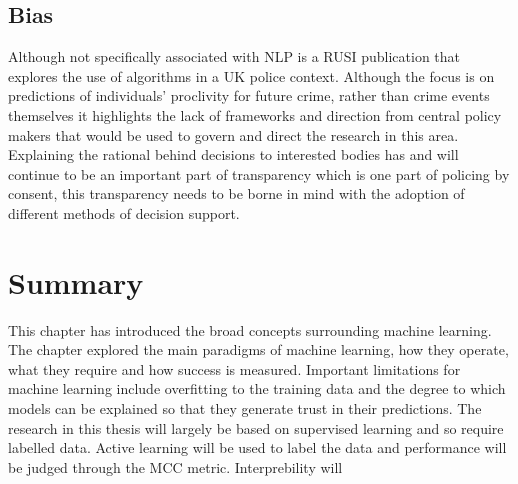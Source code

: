 \subsection{Bias}
Although not specifically associated with NLP  \textcite{babuta2018machine} is a RUSI publication that explores the use of algorithms in a UK police context. Although the focus is on predictions of individuals' proclivity for future crime, rather than crime events themselves it highlights the lack of frameworks and direction from central policy makers that would be used to govern and direct the research in this area. Explaining the rational behind decisions to interested bodies has and will continue to be an important part of transparency which is one part of policing by consent, this transparency needs to be borne in mind with the adoption of different methods of decision support. 

\section{Summary}

This chapter has introduced the broad concepts surrounding machine learning. The chapter explored the main paradigms of machine learning, how they operate, what they require and how success is measured. Important limitations for machine learning include overfitting to the training data  and the degree to which models can be explained so that they generate trust in their predictions. The research in this thesis will largely be based on supervised learning and so require labelled data. Active learning will be used to label the data and performance will be judged through the MCC metric. Interprebility will  

